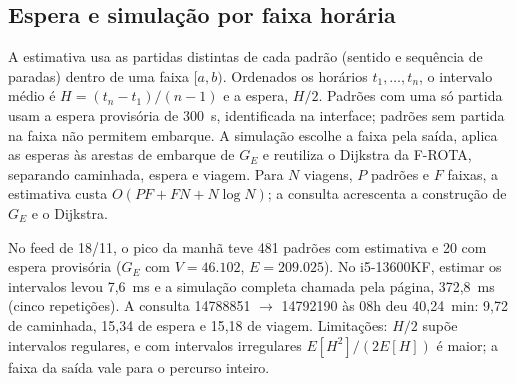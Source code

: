 \subsection{Espera e simulação por faixa horária}\label{sec:F-ESPERA}

A estimativa usa as partidas distintas de cada padrão (sentido e sequência de paradas) dentro de
uma faixa $[a, b)$. Ordenados os horários $t_1, \ldots, t_n$, o intervalo médio é
$H = (t_n - t_1)/(n - 1)$ e a espera, $H/2$. Padrões com uma só partida usam a espera provisória
de 300~s, identificada na interface; padrões sem partida na faixa não permitem embarque. A
simulação escolhe a faixa pela saída, aplica as esperas às arestas de embarque de $G_E$ e
reutiliza o Dijkstra da F-ROTA, separando caminhada, espera e viagem. Para $N$ viagens, $P$
padrões e $F$ faixas, a estimativa custa $O(PF + FN + N\log N)$; a consulta acrescenta a
construção de $G_E$ e o Dijkstra.

No feed de 18/11, o pico da manhã teve 481 padrões com estimativa e 20 com espera provisória
($G_E$ com $V = 46.102$, $E = 209.025$). No i5-13600KF, estimar os intervalos levou 7,6~ms e a
simulação completa chamada pela página, 372,8~ms (cinco repetições). A consulta
14788851 $\rightarrow$ 14792190 às 08h deu 40,24~min: 9,72 de caminhada, 15,34 de espera e
15,18 de viagem. Limitações: $H/2$ supõe intervalos regulares, e com intervalos irregulares
$E[H^2]/(2E[H])$ é maior; a faixa da saída vale para o percurso inteiro.
